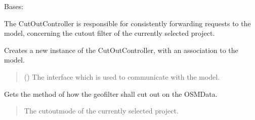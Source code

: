 \documentclass[letterpaper,10pt,english]{sphinxmanual}
\begin{document}
\begin{fulllineitems}
\label{\detokenize{apidoc/src.osm_configurator.control:src.osm_configurator.control.cut_out_controller.CutOutController}}
\pysigstartsignatures
{}
\pysigstopsignatures
\sphinxAtStartPar
Bases: 

\sphinxAtStartPar
The CutOutController is responsible for consistently forwarding requests to the model,
concerning the cut\sphinxhyphen{}out filter of the currently selected project.

\begin{fulllineitems}
\label{\detokenize{apidoc/src.osm_configurator.control:src.osm_configurator.control.cut_out_controller.CutOutController.__init__}}
\pysigstartsignatures
{}
\pysigstopsignatures
\sphinxAtStartPar
Creates a new instance of the CutOutController, with an association to the model.
\begin{quote}\begin{description}
\sphinxAtStartPar
{} ({\hyperref[\detokenize{apidoc/src.osm_configurator.model.application:src.osm_configurator.model.application.application_interface.IApplication}]{}}) \textendash{} The interface which is used to communicate with the model.

\end{description}\end{quote}

\end{fulllineitems}


\begin{fulllineitems}
\label{\detokenize{apidoc/src.osm_configurator.control:src.osm_configurator.control.cut_out_controller.CutOutController.get_cut_out_mode}}
\pysigstartsignatures
{}
\pysigstopsignatures
\sphinxAtStartPar
Gets the method of how the geofilter shall cut out on the OSM\sphinxhyphen{}Data.
\begin{quote}\begin{description}
\sphinxAtStartPar
The cut\sphinxhyphen{}out\sphinxhyphen{}mode of the currently selected project.


\end{description}
\end{quote}
\end{fulllineitems}
\end{fulllineitems}
\end{document}
